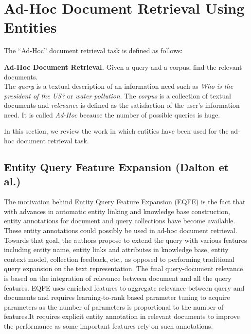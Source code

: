 \documentclass{article}
\begin{document}

\section{Ad-Hoc Document Retrieval Using Entities}
\label{sec:doc-ret-using-ent}
The ``Ad-Hoc'' document retrieval task is defined as follows:

\textbf{Ad-Hoc Document Retrieval.} Given a query and a corpus, find the relevant documents.\\
The \textit{query} is a textual description of an information need such as \textit{Who is the president of the US?} or \textit{water pollution}. The \textit{corpus} is a collection of textual documents and \textit{relevance} is defined as the satisfaction of the user's information need. It is called \textit{Ad-Hoc} because the number of possible queries is huge. 

In this section, we review the work in which entities have been used for the ad-hoc document retrieval task.

\subsection{Entity Query Feature Expansion (Dalton et al.\cite{dalton2014entity})}
\label{subsec:eqfe}

The motivation behind Entity Query Feature Expansion (EQFE) is the fact that with advances in automatic entity linking and knowledge base construction, entity annotations for document and query collections have become available. These entity annotations could possibly be used in ad-hoc document retrieval. Towards that goal, the authors propose to extend the query with various features including entity name, entity links and attributes in knowledge base, entity context model, collection feedback, etc., as opposed to performing traditional query expansion on the text representation. The final query-document relevance is based on the integration of relevance between document and all the query features. EQFE uses enriched features to aggregate relevance between query and documents and requires learning-to-rank based parameter tuning to acquire parameters as the number of parameters is proportional to the number of features.It requires explicit entity annotation in relevant documents to improve the performance as some important features rely on such annotations.
\end{document}

